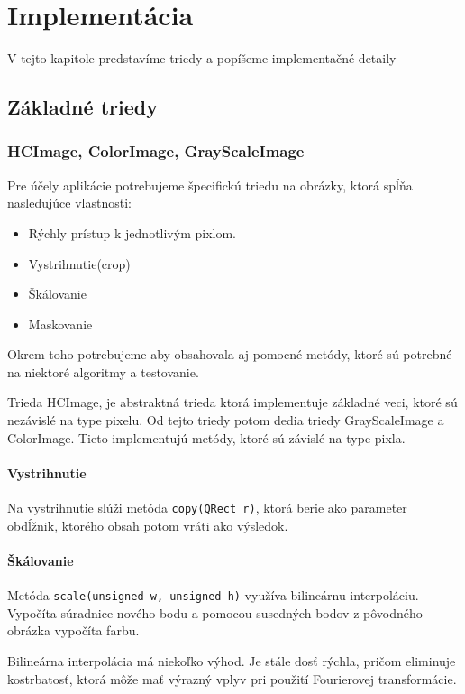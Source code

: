 \chapter{Implementácia}\label{chap:implementation}

V tejto kapitole predstavíme triedy a popíšeme implementačné detaily 
\bigskip

\section{Základné triedy}
\subsection{HCImage, ColorImage, GrayScaleImage}

Pre účely aplikácie potrebujeme špecifickú triedu na obrázky, ktorá spĺňa nasledujúce vlastnosti:
\begin{itemize}
\item Rýchly prístup k jednotlivým pixlom.
\item Vystrihnutie(crop)
\item Škálovanie
\item Maskovanie
\end{itemize}
Okrem toho potrebujeme aby obsahovala aj pomocné metódy, ktoré sú potrebné na niektoré algoritmy a testovanie.

Trieda HCImage, je abstraktná trieda ktorá implementuje základné veci, ktoré sú nezávislé na type pixelu. Od tejto triedy potom dedia triedy GrayScaleImage a ColorImage. Tieto implementujú metódy, ktoré sú závislé na type pixla. 


\subsubsection{Vystrihnutie}
Na vystrihnutie slúži metóda {\tt copy(QRect r)}, ktorá berie ako parameter obdĺžnik, ktorého obsah potom vráti ako výsledok. 

\subsubsection{Škálovanie}
Metóda {\tt scale(unsigned w, unsigned h)} využíva bilineárnu interpoláciu. Vypočíta súradnice nového bodu a pomocou susedných bodov z pôvodného obrázka vypočíta farbu.

Bilineárna interpolácia má niekoľko výhod. Je stále dosť rýchla, pričom eliminuje kostrbatosť, ktorá môže mať výrazný vplyv pri použití Fourierovej transformácie.

